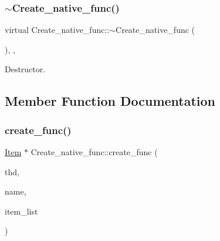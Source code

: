 \subsubsection{\texorpdfstring{$\sim$\+Create\+\_\+native\+\_\+func()}{~Create\_native\_func()}}
{\footnotesize\ttfamily virtual Create\+\_\+native\+\_\+func\+::$\sim$\+Create\+\_\+native\+\_\+func (\begin{DoxyParamCaption}{ }\end{DoxyParamCaption})\hspace{0.3cm}{\ttfamily [inline]}, {\ttfamily [protected]}, {\ttfamily [virtual]}}

Destructor. 

\subsection{Member Function Documentation}
\mbox{\label{classCreate__native__func_ac93ced4c4ed523538b76d34d17377a40}} 
\subsubsection{\texorpdfstring{create\+\_\+func()}{create\_func()}}
{\footnotesize\ttfamily \mbox{\hyperlink{classItem}{Item}} $\ast$ Create\+\_\+native\+\_\+func\+::create\+\_\+func (\begin{DoxyParamCaption}\item[{T\+HD $\ast$}]{thd,  }\item[{L\+E\+X\+\_\+\+S\+T\+R\+I\+NG}]{name,  }\item[{\mbox{\hyperlink{classPT__item__list}{P\+T\+\_\+item\+\_\+list}} $\ast$}]{item\+\_\+list }\end{DoxyParamCaption})\hspace{0.3cm}{\ttfamily [virtual]}}

